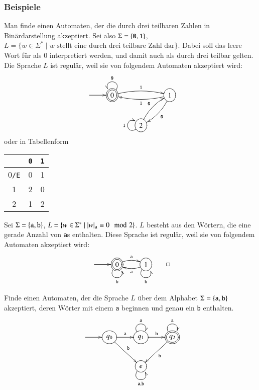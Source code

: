 \subsubsection{Beispiele}
\begin{beispiel} 
Man finde einen Automaten, der die durch drei teilbaren Zahlen in
Binärdarstellung akzeptiert.
Sei also $\Sigma=\{{\tt 0},{\tt 1}\}$,
$L=\{w\in\Sigma^*\;|\; \text{$w$ stellt eine durch drei teilbare Zahl dar}\}.$
Dabei soll das leere Wort für als $0$
interpretiert werden, und damit auch als durch drei teilbar gelten.
Die Sprache $L$ ist regulär, weil sie
von folgendem Automaten akzeptiert wird:
\[
\entrymodifiers={++[o][F]}
\xymatrix{
*+\txt{} \ar[r]
	&*++[o][F=]{0} \ar@/^/[rr]^{\tt 1} \ar@(ur,ul)_{\tt 0}
		&*+\txt{}
			&{1} \ar@/^/[dl]^{\tt 0}  \ar@/^/[ll]^{\tt 1}
\\
*+\txt{}
	&*+\txt{}
		&2\ar@/^/[ur]^{\tt 0} \ar@(dl,ul)^{\tt 1}
}
\]
oder in Tabellenform
\begin{center}
\begin{tabular}{|c|cc|}
\hline
&\tt 0&\tt 1\\
\hline
0{\tt /E}&0&1\\
1        &2&0\\
2        &1&2\\
\hline
\end{tabular}
\end{center}
\end{beispiel}

\begin{beispiel}
Sei $\Sigma=\{{\tt a},{\tt b}\}$,
$L=\{w\in\Sigma^*\;|\; |w|_{\tt a}\equiv 0\mod 2\}$.
$L$ besteht aus den Wörtern, die  eine gerade Anzahl von {\tt a}s enthalten.
Diese Sprache ist regulär, weil sie von folgendem Automaten akzeptiert wird:
\[
\entrymodifiers={++[o][F]}
\xymatrix{
*+\txt{} \ar[r]
	&*++[o][F=]{0}\ar@/^/[r]^{\tt a} \ar@(dl,dr)_{\tt b}
		&1 \ar@/^/[l]^{\tt a} \ar@(dl,dr)_{\tt b}
}
\qedhere
\]
\end{beispiel}

\begin{beispiel}
Finde einen Automaten, der die Sprache $L$ über dem Alphabet
$\Sigma=\{{\tt a},{\tt b}\}$ akzeptiert, deren Wörter mit 
einem {\tt a} beginnen und genau ein {\tt b} enthalten.
\[
\entrymodifiers={++[o][F]}
\xymatrix{
*+\txt{} \ar[r]
	&{q_0} \ar[r]^{\tt a} \ar[dr]^{\tt b}
		&{q_1} \ar@(ul,ur)^{\tt a} \ar[r]^{\tt b}
			&*++[o][F=]{q_2}\ar@(ul,ur)^{\tt a}  \ar[dl]^{\tt b}
\\
*+\txt{}
	&*+\txt{}
		&{e}\ar@(dl,dr)_{{\tt a},{\tt b}}
}
\]
\end{beispiel}

